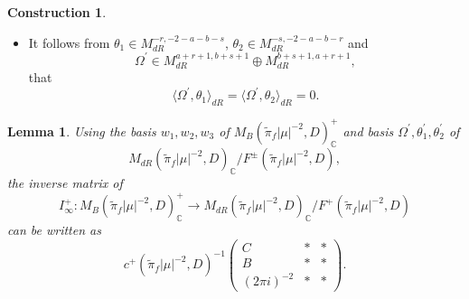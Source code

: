 \documentclass[11pt, a4paper]{amsart}
\theoremstyle{plain}
\newtheorem{lemma}[theorem]{Lemma}
\theoremstyle{definition}
\newtheorem{construction}[theorem]{Construction}
\numberwithin{equation}{section}
\def\CC{\mathbb{C}}
\begin{document}
\begin{construction}
\begin{itemize}
            that 
            \begin{equation*}
                \Omega^{\prime} \in M_{dR}^{a + r + 1, b + s + 1} \oplus M_{dR}^{b + s + 1, a + r + 1}. 
            \end{equation*}
            Hence, $\Omega^{\prime}, \theta_1^{\prime}, \theta_{2}^{\prime}$ is a basis of $M_{dR}(\tilde{\pi}_{f}|\mu|^{-2}, D)_{\CC} / F^{\pm}(\tilde{\pi}_{f}|\mu|^{-2}, D)$. 
            \item It follows from $\theta_1 \in M_{dR}^{-r, -2-a-b-s}$, $\theta_2 \in M_{dR}^{-s, -2-a-b-r}$ and 
            \begin{equation*}
            \Omega^{\prime} \in M_{dR}^{a + r + 1, b + s + 1} \oplus M_{dR}^{b + s + 1, a + r + 1},
            \end{equation*}
            that 
            \begin{equation*}
            \langle \Omega^{\prime} , \theta_1 \rangle_{dR} =  \langle \Omega^{\prime} , \theta_2 \rangle_{dR} = 0. 
            \end{equation*}
    \end{itemize}
    
\end{construction}

\begin{lemma}
\label{lemma: inverse matric for periods}
    Using the basis $w_1, w_2, w_3$ of $M_{B}(\tilde{\pi}_{f}|\mu|^{-2}, D)^{+}_{\CC}$ and basis $\Omega^{\prime}, \theta_1^{\prime}, \theta_2^{\prime}$ of 
    \begin{equation*}
        M_{dR}(\tilde{\pi}_{f}|\mu|^{-2}, D)_{\CC} / F^{\pm}(\tilde{\pi}_{f}|\mu|^{-2}, D), 
    \end{equation*}
    the inverse matrix of 
    \begin{equation*}
         I_{\infty}^{+} \colon M_{B}(\tilde{\pi}_{f}|\mu|^{-2}, D)_{\CC}^{+} \longrightarrow M_{dR}(\tilde{\pi}_{f}|\mu|^{-2}, D)_{\CC} / F^{+}(\tilde{\pi}_{f}|\mu|^{-2}, D)
    \end{equation*}
    can be written as 
    \begin{equation*}
         c^{+}(\tilde{\pi}_{f}|\mu|^{-2}, D)^{-1}\begin{pmatrix}
                                                C & * & * \\
                                                B & * & * \\
                                                (2\pi{i})^{-2} & * & * 
         \end{pmatrix}. 
    \end{equation*}
\end{lemma}
\end{document}
